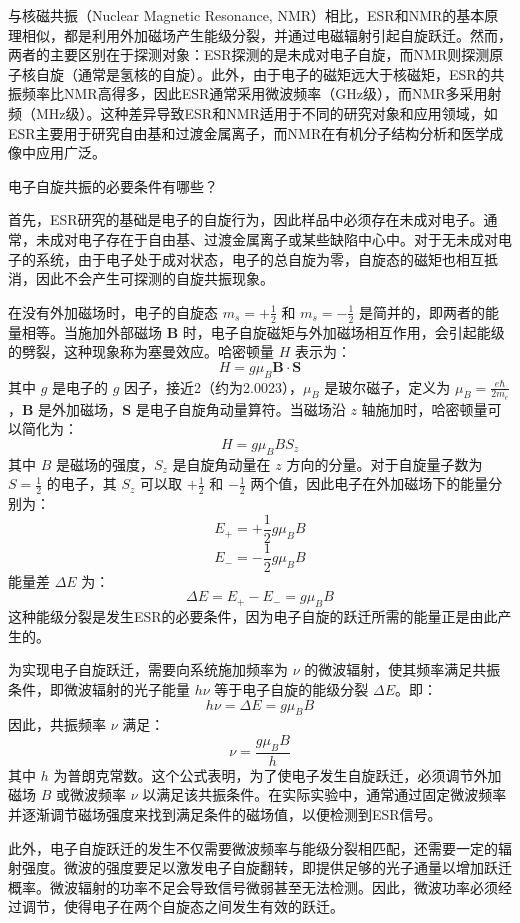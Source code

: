 与核磁共振（Nuclear Magnetic Resonance, NMR）相比，ESR和NMR的基本原理相似，都是利用外加磁场产生能级分裂，并通过电磁辐射引起自旋跃迁。然而，两者的主要区别在于探测对象：ESR探测的是未成对电子自旋，而NMR则探测原子核自旋（通常是氢核的自旋）。此外，由于电子的磁矩远大于核磁矩，ESR的共振频率比NMR高得多，因此ESR通常采用微波频率（GHz级），而NMR多采用射频（MHz级）。这种差异导致ESR和NMR适用于不同的研究对象和应用领域，如ESR主要用于研究自由基和过渡金属离子，而NMR在有机分子结构分析和医学成像中应用广泛。

\begin{question}
	电子自旋共振的必要条件有哪些？
\end{question}
首先，ESR研究的基础是电子的自旋行为，因此样品中必须存在未成对电子。通常，未成对电子存在于自由基、过渡金属离子或某些缺陷中心中。对于无未成对电子的系统，由于电子处于成对状态，电子的总自旋为零，自旋态的磁矩也相互抵消，因此不会产生可探测的自旋共振现象。

在没有外加磁场时，电子的自旋态 \( m_s = +\frac{1}{2} \) 和 \( m_s = -\frac{1}{2} \) 是简并的，即两者的能量相等。当施加外部磁场 \( \mathbf{B} \) 时，电子自旋磁矩与外加磁场相互作用，会引起能级的劈裂，这种现象称为塞曼效应。哈密顿量 \( H \) 表示为：\[ H = g \mu_B \mathbf{B} \cdot \mathbf{S} \]其中 \( g \) 是电子的 \( g \) 因子，接近2（约为2.0023），\( \mu_B \) 是玻尔磁子，定义为 \( \mu_B = \frac{e \hbar}{2m_e} \)，\( \mathbf{B} \) 是外加磁场，\( \mathbf{S} \) 是电子自旋角动量算符。当磁场沿 \( z \) 轴施加时，哈密顿量可以简化为：\[ H = g \mu_B B S_z \]其中 \( B \) 是磁场的强度，\( S_z \) 是自旋角动量在 \( z \) 方向的分量。对于自旋量子数为 \( S = \frac{1}{2} \) 的电子，其 \( S_z \) 可以取 \( +\frac{1}{2} \) 和 \( -\frac{1}{2} \) 两个值，因此电子在外加磁场下的能量分别为：\[ E_{+} = +\frac{1}{2} g \mu_B B \] \[ E_{-} = -\frac{1}{2} g \mu_B B \]能量差 \( \Delta E \) 为：\[ \Delta E = E_{+} - E_{-} = g \mu_B B \]这种能级分裂是发生ESR的必要条件，因为电子自旋的跃迁所需的能量正是由此产生的。

为实现电子自旋跃迁，需要向系统施加频率为 \( \nu \) 的微波辐射，使其频率满足共振条件，即微波辐射的光子能量 \( h \nu \) 等于电子自旋的能级分裂 \( \Delta E \)。即：\[ h \nu = \Delta E = g \mu_B B \]因此，共振频率 \( \nu \) 满足：\[ \nu = \frac{g \mu_B B}{h} \]其中 \( h \) 为普朗克常数。这个公式表明，为了使电子发生自旋跃迁，必须调节外加磁场 \( B \) 或微波频率 \( \nu \) 以满足该共振条件。在实际实验中，通常通过固定微波频率并逐渐调节磁场强度来找到满足条件的磁场值，以便检测到ESR信号。

此外，电子自旋跃迁的发生不仅需要微波频率与能级分裂相匹配，还需要一定的辐射强度。微波的强度要足以激发电子自旋翻转，即提供足够的光子通量以增加跃迁概率。微波辐射的功率不足会导致信号微弱甚至无法检测。因此，微波功率必须经过调节，使得电子在两个自旋态之间发生有效的跃迁。

